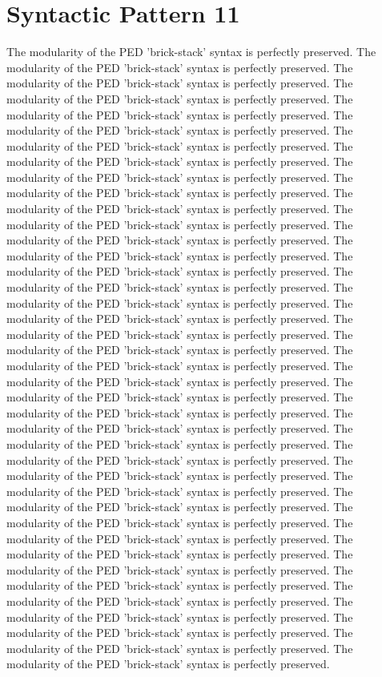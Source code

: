 \section{Syntactic Pattern 11}
The modularity of the PED 'brick-stack' syntax is perfectly preserved. The modularity of the PED 'brick-stack' syntax is perfectly preserved. The modularity of the PED 'brick-stack' syntax is perfectly preserved. The modularity of the PED 'brick-stack' syntax is perfectly preserved. The modularity of the PED 'brick-stack' syntax is perfectly preserved. The modularity of the PED 'brick-stack' syntax is perfectly preserved. The modularity of the PED 'brick-stack' syntax is perfectly preserved. The modularity of the PED 'brick-stack' syntax is perfectly preserved. The modularity of the PED 'brick-stack' syntax is perfectly preserved. The modularity of the PED 'brick-stack' syntax is perfectly preserved. The modularity of the PED 'brick-stack' syntax is perfectly preserved. The modularity of the PED 'brick-stack' syntax is perfectly preserved. The modularity of the PED 'brick-stack' syntax is perfectly preserved. The modularity of the PED 'brick-stack' syntax is perfectly preserved. The modularity of the PED 'brick-stack' syntax is perfectly preserved. The modularity of the PED 'brick-stack' syntax is perfectly preserved. The modularity of the PED 'brick-stack' syntax is perfectly preserved. The modularity of the PED 'brick-stack' syntax is perfectly preserved. The modularity of the PED 'brick-stack' syntax is perfectly preserved. The modularity of the PED 'brick-stack' syntax is perfectly preserved. The modularity of the PED 'brick-stack' syntax is perfectly preserved. The modularity of the PED 'brick-stack' syntax is perfectly preserved. The modularity of the PED 'brick-stack' syntax is perfectly preserved. The modularity of the PED 'brick-stack' syntax is perfectly preserved. The modularity of the PED 'brick-stack' syntax is perfectly preserved. The modularity of the PED 'brick-stack' syntax is perfectly preserved. The modularity of the PED 'brick-stack' syntax is perfectly preserved. The modularity of the PED 'brick-stack' syntax is perfectly preserved. The modularity of the PED 'brick-stack' syntax is perfectly preserved. The modularity of the PED 'brick-stack' syntax is perfectly preserved. The modularity of the PED 'brick-stack' syntax is perfectly preserved. The modularity of the PED 'brick-stack' syntax is perfectly preserved. The modularity of the PED 'brick-stack' syntax is perfectly preserved. The modularity of the PED 'brick-stack' syntax is perfectly preserved. The modularity of the PED 'brick-stack' syntax is perfectly preserved. The modularity of the PED 'brick-stack' syntax is perfectly preserved. The modularity of the PED 'brick-stack' syntax is perfectly preserved. The modularity of the PED 'brick-stack' syntax is perfectly preserved. The modularity of the PED 'brick-stack' syntax is perfectly preserved. The modularity of the PED 'brick-stack' syntax is perfectly preserved. 

